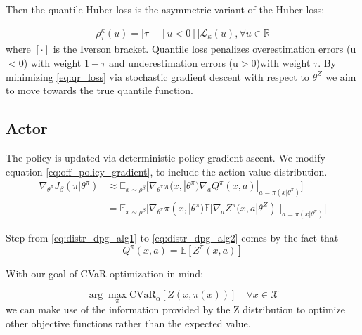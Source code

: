 Then the quantile Huber loss is the asymmetric variant of the Huber loss:

\begin{align}
    \rho_\tau^\kappa(u)=\Big|\tau - [u<0]\Big|\mathcal{L}_\kappa(u) , \forall u \in \mathbb{R}
\end{align}
where $[\cdot]$ is the Iverson bracket.
Quantile loss penalizes overestimation errors (u$<$0) with weight $1-\tau$ and underestimation
errors (u$>$0)with weight $\tau$.
By minimizing \ref{eq:qr_loss} via stochastic gradient descent with respect to $\theta^Z$
we aim to move towards the true quantile function. 

\subsection{Actor}
The policy is updated via deterministic policy gradient ascent.
We modify equation  \eqref{eq:off_policy_gradient}, to include the action-value distribution.
\begin{align}
    \nabla_{\theta^\pi} J_\beta(\pi | \theta^\pi) &\approx \mathbb E_{x \sim \rho^\beta} 
    \big [\nabla_{\theta^\pi} \pi(x,| \theta^\pi) \nabla_a Q^{\pi}(x,a)|_{a=\pi(x| \theta^\pi)}  \big]\label{eq:distr_dpg_alg1}\\
    &=\mathbb E_{x \sim \rho^\beta} 
    \big [\nabla_{\theta^\pi} \pi(x,| \theta^\pi) \mathbb E [\nabla_a Z^\pi(x,a | \theta^Z)]|_{a=\pi(x| \theta^\pi)}  \big]
    \label{eq:distr_dpg_alg2}
\end{align}


Step from \eqref{eq:distr_dpg_alg1} to \eqref{eq:distr_dpg_alg2} comes by the fact that
\begin{equation}
    Q^\pi(x,a) = \mathbb E[Z^\pi(x,a)] \label{eq:neutral_policy}
\end{equation}

With our goal of CVaR optimization in mind:

\begin{equation}
     \arg \underset{\pi}\max \text{CVaR}_\alpha [Z (x, \pi(x))] \quad \forall x \in \mathcal{X}
\end{equation}
we can make use of the information provided by the Z distribution to 
optimize other objective functions rather than the expected value.


